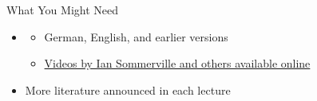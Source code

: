 \begin{frame}{What You Might Need}
	\begin{fancycolumns}[animation=none]
		\centering{}
		\nextcolumn
		\begin{definition}{\mysource{\sommerville}}
			\begin{itemize}
				\item {}
				\begin{itemize}
					\item German, English, and earlier versions
					\item \href{https://software-engineering-book.com/videos/}{Videos by Ian Sommerville and others available online}
				\end{itemize}
				\item More literature announced in each lecture
			\end{itemize}
		\end{definition}
	\end{fancycolumns}
\end{frame}

%
%
%
%
